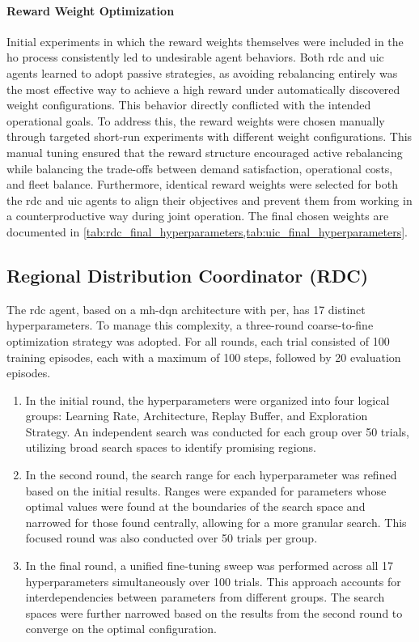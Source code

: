 \paragraph{Reward Weight Optimization}
Initial experiments in which the reward weights themselves were included in the \gls{ho} process consistently led to undesirable agent behaviors.
Both \gls{rdc} and \gls{uic} agents learned to adopt passive strategies, as avoiding rebalancing entirely was the most effective way to achieve a high reward under automatically discovered weight configurations.
This behavior directly conflicted with the intended operational goals.
To address this, the reward weights were chosen manually through targeted short-run experiments with different weight configurations.
This manual tuning ensured that the reward structure encouraged active rebalancing while balancing the trade-offs between demand satisfaction, operational costs, and fleet balance.
Furthermore, identical reward weights were selected for both the \gls{rdc} and \gls{uic} agents to align their objectives and prevent them from working in a counterproductive way during joint operation.
The final chosen weights are documented in \cref{tab:rdc_final_hyperparameters,tab:uic_final_hyperparameters}.

\subsection{Regional Distribution Coordinator (RDC)}\label{sec:evaluation-ho-rdc}
The \gls{rdc} agent, based on a \gls{mh-dqn} architecture with \gls{per}, has 17 distinct hyperparameters.
To manage this complexity, a three-round coarse-to-fine optimization strategy was adopted.
For all rounds, each trial consisted of 100 training episodes, each with a maximum of 100 steps, followed by 20 evaluation episodes.

\begin{enumerate}
    \item 
        In the initial round, the hyperparameters were organized into four logical groups: Learning Rate, Architecture, Replay Buffer, and Exploration Strategy.
        An independent search was conducted for each group over 50 trials, utilizing broad search spaces to identify promising regions.
    \item 
        In the second round, the search range for each hyperparameter was refined based on the initial results.
        Ranges were expanded for parameters whose optimal values were found at the boundaries of the search space and narrowed for those found centrally, allowing for a more granular search.
        This focused round was also conducted over 50 trials per group.
    \item 
        In the final round, a unified fine-tuning sweep was performed across all 17 hyperparameters simultaneously over 100 trials.
        This approach accounts for interdependencies between parameters from different groups.
        The search spaces were further narrowed based on the results from the second round to converge on the optimal configuration.
\end{enumerate}

